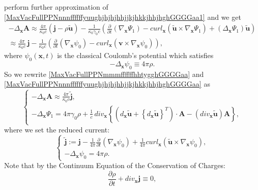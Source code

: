 \documentclass{article}
\theoremstyle{definition}
\theoremstyle{remark}
\renewcommand{\vec}[1]{\mathbf{#1}}
\newcommand{\R}{\mathbb{R}}
\newcommand{\er}{\eqref}
\newcommand{\R}{{\mathbb{R}}}
\newcommand{\er}{\eqref}
\begin{document}
perform further approximation of
\er{MaxVacFullPPNnnnffffffyuughjhjhjhhjjkjhkkjhhjhghGGGGaa1} and we
get
\begin{multline}\label{MaxVacFullPPNnnnffffffyuughjhjhjhhjjkjhkkjhhjhghGGGGaa}
-\Delta_{\vec x}\vec A\approx\frac{4\pi}{\kappa_0 c}\left(\vec
j-\rho\vec {\tilde u}\right)-\frac{1}{\kappa_0\gamma_0
c}\left(\frac{\partial}{\partial t}\left(\nabla_{\vec
x}\Psi_1\right)-curl_{\vec x}\left(\vec {\tilde u}\times\nabla_{\vec
x}\Psi_1\right)+\left(\Delta_{\vec x}\Psi_1\right)\vec {\tilde
u}\right)
\\\approx\frac{4\pi}{\kappa_0 c}\,\vec
j-\frac{1}{\kappa_0 c}\left(\frac{\partial}{\partial
t}\left(\nabla_{\vec x}\psi_0\right)-curl_{\vec x}\left(\vec
v\times\nabla_{\vec x}\psi_0\right)\right),
\end{multline}
where $\psi_0(\vec x,t)$ is the classical Coulomb's potential which
satisfies
\begin{equation}\label{columbPPNaa}
-\Delta_{\vec x}\psi_0\equiv 4\pi\rho.
\end{equation}
So we rewrite \er{MaxVacFullPPNmmmffffffhhtygghGGGGaa} and
\er{MaxVacFullPPNnnnffffffyuughjhjhjhhjjkjhkkjhhjhghGGGGaa} as
\begin{equation}\label{MaxVacFull1bjkgjhjhgjgjgkjfhjfdghcgjhhjgkgkgugyyurhjfffhfjklhhhgkjgGGaaKK}
\begin{cases}
-\Delta_{\vec x}\vec A \approx\frac{4\pi}{\kappa_0 c}\vec {\widetilde j},\\
-\Delta_{\vec x}\Psi_1=4\pi\gamma_0\rho+\frac{1}{c}\,div_{\vec x}
\left\{\left(d_{\vec x}\vec {\tilde u}+\left\{d_{\vec x}\vec {\tilde
u}\right\}^T\right)\cdot\vec A-\left(div_{\vec x}\vec {\tilde
u}\right)\vec A\right\},
\end{cases}
\end{equation}
where we set the reduced current:
\begin{equation}\label{reducedcurrentfhfhjfhjGGaa}
\begin{cases}
\vec {\widetilde j}:=\vec j-\frac{1}{4\pi}\frac{\partial}{\partial
t} \left(\nabla_{\vec x}\psi_0\right)+\frac{1}{4\pi}curl_{\vec
x}\left(\vec {\tilde u}\times \nabla_{\vec x}\psi_0\right),\\
-\Delta_{\vec x}\psi_0= 4\pi\rho.
\end{cases}
\end{equation}
Note that by the Continuum Equation of the Conservation of Charges:
\begin{equation}\label{toksohraneniezarjadaPPNaa}
\frac{\partial\rho}{\partial t}+div_{\vec x}\vec j\equiv 0,
\end{equation}
\end{document}
